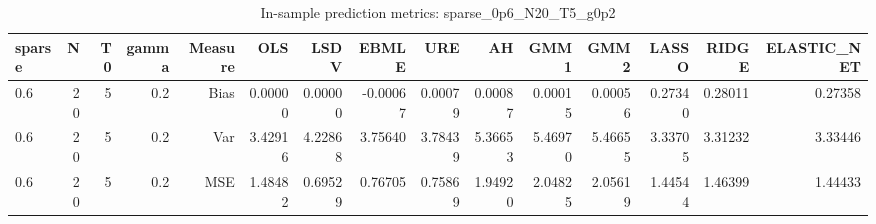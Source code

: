 \begin{table}[!htbp]\centering
\caption{In-sample prediction metrics: sparse_0p6_N20_T5_g0p2}
\label{tab:table2_sparse_0p6_N20_T5_g0p2}
\begin{tabular}{lrrrrrrrrrrrrrr}
\hline
sparse & N & T0 & gamma & Measure & OLS & LSDV & EBMLE & URE & AH & GMM1 & GMM2 & LASSO & RIDGE & ELASTIC_NET \\
\hline
0.6 & 20 & 5 & 0.2 & Bias & 0.00000 & 0.00000 & -0.00067 & 0.00079 & 0.00087 & 0.00015 & 0.00056 & 0.27340 & 0.28011 & 0.27358 \\
0.6 & 20 & 5 & 0.2 & Var & 3.42916 & 4.22868 & 3.75640 & 3.78439 & 5.36653 & 5.46970 & 5.46655 & 3.33705 & 3.31232 & 3.33446 \\
0.6 & 20 & 5 & 0.2 & MSE & 1.48482 & 0.69529 & 0.76705 & 0.75869 & 1.94920 & 2.04825 & 2.05619 & 1.44544 & 1.46399 & 1.44433 \\
\hline
\end{tabular}
\end{table}

